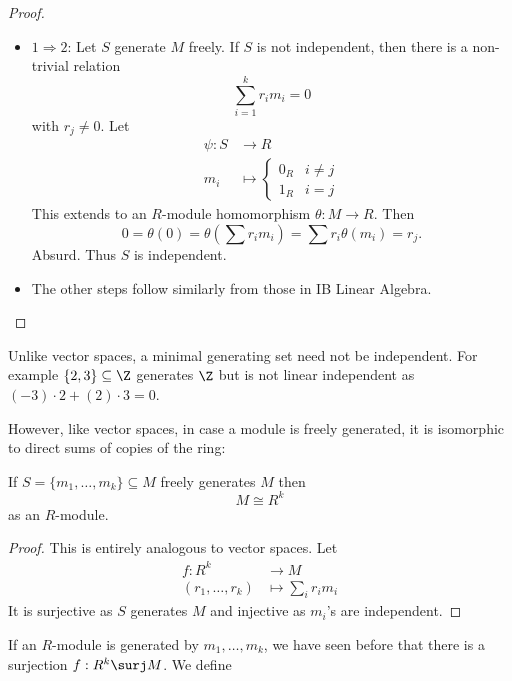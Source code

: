 \documentclass[a4paper]{article}
\theoremstyle{definition}
\begin{document}
\begin{proof}\leavevmode
  \begin{itemize}
  \item \(1 \Rightarrow 2\): Let \(S\) generate \(M\) freely. If \(S\) is not independent, then there is a non-trivial relation
    \[
      \sum_{i = 1}^k r_im_i = 0
    \]
    with \(r_j \neq 0\). Let
    \begin{align*}
      \psi: S &\to R \\
      m_i &\mapsto
            \begin{cases}
              0_R & i \neq j \\
              1_R & i = j
            \end{cases}
    \end{align*}
    This extends to an \(R\)-module homomorphism \(\theta: M \to R\). Then
    \[
      0 = \theta(0) = \theta \left(\sum r_im_i \right) = \sum r_i\theta(m_i) = r_j.
    \]
    Absurd. Thus \(S\) is independent.
  \item The other steps follow similarly from those in IB Linear Algebra.
  \end{itemize}
\end{proof}

\begin{eg}
  Unlike vector spaces, a minimal generating set need not be independent. For example \(\{2, 3\} \subseteq \Z\) generates \(\Z\) but is not linear independent as \((-3) \cdot 2 + (2) \cdot 3 = 0\).
\end{eg}

However, like vector spaces, in case a module is freely generated, it is isomorphic to direct sums of copies of the ring:

\begin{lemma}
  If \(S = \{m_1, \dots, m_k\} \subseteq M\) freely generates \(M\) then
  \[
    M \cong R^k
  \]
  as an \(R\)-module.
\end{lemma}

\begin{proof}
  This is entirely analogous to vector spaces. Let
  \begin{align*}
    f: R^k &\to M \\
    (r_1, \dots, r_k) &\mapsto \sum_i r_im_i
  \end{align*}
  It is surjective as \(S\) generates \(M\) and injective as \(m_i\)'s are independent.
\end{proof}

If an \(R\)-module is generated by \(m_1, \dots, m_k\), we have seen before that there is a surjection \(f: R^k \surj M\). We define
\end{document}
